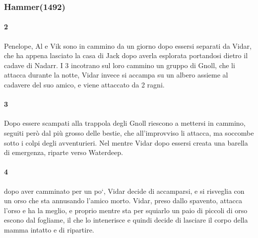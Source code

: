 \documentclass{article}
\begin{document}
              \subsubsection{Hammer(1492)}
                  \paragraph{2} Penelope, Al e Vik sono in cammino da un giorno dopo essersi separati da Vidar, che ha appena lasciato la casa di Jack dopo averla esplorata portandosi dietro il cadave di Nadarr. I 3 incotrano sul loro cammino un gruppo di Gnoll, che li attacca durante la notte, Vidar invece si accampa su un albero assieme al cadavere del suo amico, e viene attaccato da 2 ragni. 
                  \paragraph{3} Dopo essere scampati alla trappola degli Gnoll riescono a mettersi in cammino, seguiti però dal più grosso delle bestie, che all'improvviso li attacca, ma soccombe sotto i colpi degli avventurieri. Nel mentre Vidar dopo essersi creata una barella di emergenza, riparte verso Waterdeep. 
                  \paragraph{4} dopo aver camminato per un po`, Vidar decide di accamparsi, e si risveglia con un orso che sta annusando l'amico morto. Vidar, preso dallo spavento, attacca l'orso e ha la meglio, e proprio mentre sta per squiarlo un paio di piccoli di orso escono dal fogliame, il che lo intenerisce e quindi decide di lasciare il corpo della mamma intatto e di ripartire. 
\end{document}
